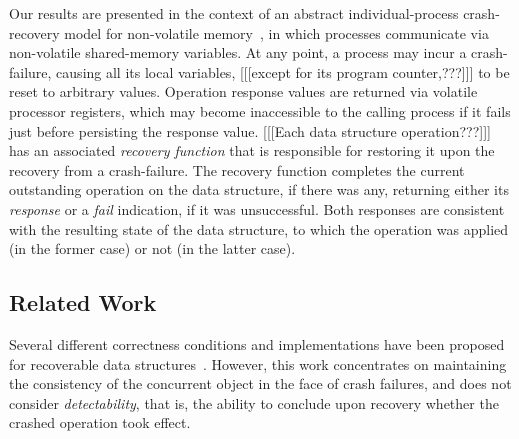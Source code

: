 Our results are presented in the context of an abstract individual-process
crash-recovery model for non-volatile memory~\cite{AttiyaBH-PODC2018},
in which processes communicate via non-volatile shared-memory variables.
At any point, a process may incur a crash-failure,
causing all its local variables, [[[except for its program counter,???]]]
to be reset to arbitrary values.
Operation response values are returned via volatile processor registers,
which may become inaccessible to the calling process if it fails
just before persisting the response value.
[[[Each data structure operation???]]] has an associated \emph{recovery
function} that is
responsible for restoring it upon the recovery from a crash-failure.
The recovery function completes the current outstanding operation on
the data structure, if there was any, returning either its \emph{response}
or a \emph{fail} indication, if it was unsuccessful.
Both responses are consistent with the resulting state of the data structure,
to which the operation was applied (in the former case)
or not (in the latter case).

\subsection*{Related Work}

Several different correctness conditions and implementations have been
proposed for recoverable data
structures~\cite{CoburnCAGGJW-Asplos2011,ChenQ-VLDB2015,VenkataramanTRC-FAST2011,%
Aguilera2003StrictLA,GolabR16,DBLP:conf/opodis/BerryhillGT15,DBLP:conf/icdcs/GuerraouiL04,DBLP:conf/wdag/IzraelevitzMS16}.
However, this work concentrates on maintaining the consistency of
the concurrent object in the face of crash failures,
and does not consider \emph{detectability}, that is, the ability to
conclude upon recovery whether the crashed operation took effect.

